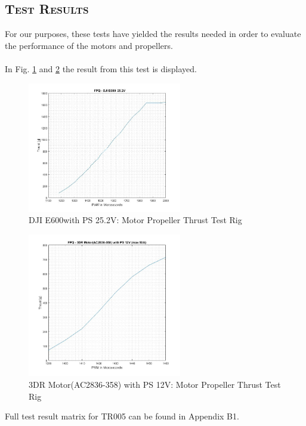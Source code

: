 \subsection*{\textsc{\medium Test Results}}
For our purposes, these tests have yielded the results needed in order to evaluate the performance of the motors and propellers.\\
\\
In Fig. \ref{fig:fpq3} and \ref{fig:fpq1} the result from this test is displayed. 
\begin{figure}[H]
    \centering
    \includegraphics[width = 0.6\textwidth]{VAPIQ-PICTURES/FPQ3}
    \caption{DJI E600with PS 25.2V: Motor Propeller Thrust Test Rig}
    \label{fig:fpq3}
\end{figure}

\begin{figure}[H]
    \centering
    \includegraphics[width = 0.6\textwidth]{VAPIQ-PICTURES/FPQ1}
    \caption{3DR Motor(AC2836-358) with PS 12V: Motor Propeller Thrust Test Rig}
    \label{fig:fpq1}
\end{figure}

Full test result matrix for TR005 can be found in Appendix B1.
 

